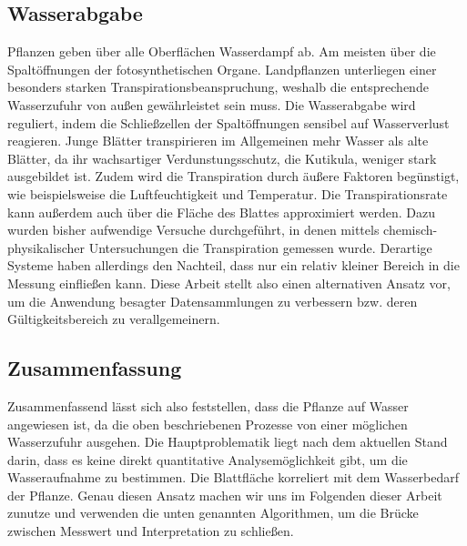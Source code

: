 \subsection{Wasserabgabe}
Pflanzen geben über alle Oberflächen Wasserdampf ab. Am meisten über die Spaltöffnungen der fotosynthetischen Organe. Landpflanzen unterliegen einer besonders starken Transpirationsbeanspruchung, weshalb die entsprechende Wasserzufuhr von außen gewährleistet sein muss. Die Wasserabgabe wird reguliert, indem die Schließzellen der Spaltöffnungen sensibel auf Wasserverlust reagieren. Junge Blätter transpirieren im Allgemeinen mehr Wasser als alte Blätter, da ihr wachsartiger Verdunstungsschutz, die Kutikula, weniger stark ausgebildet ist. Zudem wird die Transpiration durch äußere Faktoren begünstigt, wie beispielsweise die Luftfeuchtigkeit und Temperatur. Die Transpirationsrate kann außerdem auch über die Fläche des Blattes approximiert werden. Dazu wurden bisher aufwendige Versuche durchgeführt, in denen mittels chemisch-physikalischer Untersuchungen die Transpiration gemessen wurde. Derartige Systeme haben allerdings den Nachteil, dass nur ein relativ kleiner Bereich in die Messung einfließen kann. Diese Arbeit stellt also einen alternativen Ansatz vor, um die Anwendung besagter Datensammlungen zu verbessern bzw. deren Gültigkeitsbereich zu verallgemeinern.
\subsection{Zusammenfassung}
Zusammenfassend lässt sich also feststellen, dass die Pflanze auf Wasser angewiesen ist, da die oben beschriebenen Prozesse von einer möglichen Wasserzufuhr ausgehen. Die Hauptproblematik liegt nach dem aktuellen Stand darin, dass es keine direkt quantitative Analysemöglichkeit gibt, um die Wasseraufnahme zu bestimmen. \cite{exp} Die Blattfläche korreliert mit dem Wasserbedarf der Pflanze. Genau diesen Ansatz machen wir uns im Folgenden dieser Arbeit zunutze und verwenden die unten genannten Algorithmen, um die Brücke zwischen Messwert und Interpretation zu schließen.
\newpage

